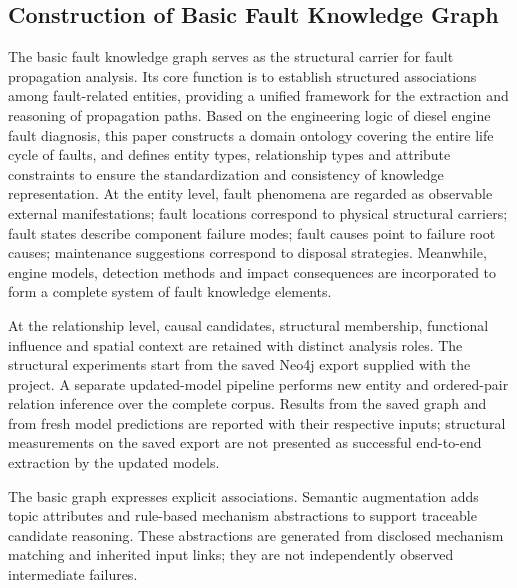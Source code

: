 \documentclass[
aps,%
12pt,%
final,%
notitlepage,%
oneside,%
onecolumn,%
nobibnotes,%
nofootinbib,%
superscriptaddress,%
noshowpacs,%
centertags]%
{revtex4}
\begin{document}
\subsection{Construction of Basic Fault Knowledge Graph}
The basic fault knowledge graph serves as the structural carrier for fault propagation analysis. Its core function is to establish structured associations among fault-related entities, providing a unified framework for the extraction and reasoning of propagation paths. Based on the engineering logic of diesel engine fault diagnosis, this paper constructs a domain ontology covering the entire life cycle of faults, and defines entity types, relationship types and attribute constraints to ensure the standardization and consistency of knowledge representation.
At the entity level, fault phenomena are regarded as observable external manifestations; fault locations correspond to physical structural carriers; fault states describe component failure modes; fault causes point to failure root causes; maintenance suggestions correspond to disposal strategies. Meanwhile, engine models, detection methods and impact consequences are incorporated to form a complete system of fault knowledge elements.

At the relationship level, causal candidates, structural membership, functional influence and spatial context are retained with distinct analysis roles. The structural experiments start from the saved Neo4j export supplied with the project. A separate updated-model pipeline performs new entity and ordered-pair relation inference over the complete corpus. Results from the saved graph and from fresh model predictions are reported with their respective inputs; structural measurements on the saved export are not presented as successful end-to-end extraction by the updated models.

The basic graph expresses explicit associations. Semantic augmentation adds topic attributes and rule-based mechanism abstractions to support traceable candidate reasoning. These abstractions are generated from disclosed mechanism matching and inherited input links; they are not independently observed intermediate failures.
\end{document}
